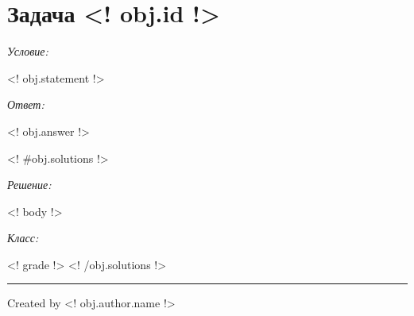 \documentclass{article}
\newcommand{\tmp}[1]{\noindent\par\textit{#1: }\nopagebreak\par}
\begin{document}
    \section{Задача \textnumero <! obj.id !>}
    \tmp{Условие}
    <! obj.statement !>
    \tmp{Ответ}
    <! obj.answer !>

    <! #obj.solutions !>
        \tmp{Решение}
        <! body !>
        \tmp{Класс}
        <! grade !>
    <! /obj.solutions !>
    
    \noindent\rule{\textwidth}{0.2pt}
    Created by <! obj.author.name !>
\end{document}
